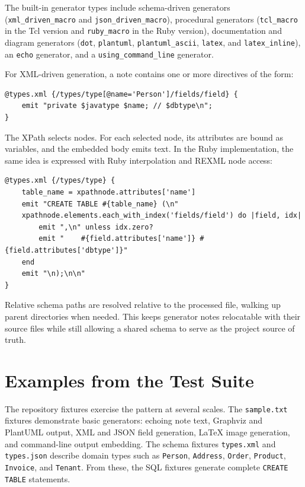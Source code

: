 \documentclass[11pt]{article}
\begin{document}
The built-in generator types include schema-driven generators
(\texttt{xml\_driven\_macro} and \texttt{json\_driven\_macro}), procedural
generators (\texttt{tcl\_macro} in the Tcl version and \texttt{ruby\_macro} in
the Ruby version), documentation and diagram generators
(\texttt{dot}, \texttt{plantuml}, \texttt{plantuml\_ascii},
\texttt{latex}, and \texttt{latex\_inline}), an \texttt{echo} generator, and a
\texttt{using\_command\_line} generator.

For XML-driven generation, a note contains one or more directives of the form:

\begin{lstlisting}[style=embgen]
@types.xml {/types/type[@name='Person']/fields/field} {
    emit "private $javatype $name; // $dbtype\n";
}
\end{lstlisting}

The XPath selects nodes.  For each selected node, its attributes are bound as
variables, and the embedded body emits text.  In the Ruby implementation, the
same idea is expressed with Ruby interpolation and REXML node access:

\begin{lstlisting}[style=embgen]
@types.xml {/types/type} {
    table_name = xpathnode.attributes['name']
    emit "CREATE TABLE #{table_name} (\n"
    xpathnode.elements.each_with_index('fields/field') do |field, idx|
        emit ",\n" unless idx.zero?
        emit "    #{field.attributes['name']} #{field.attributes['dbtype']}"
    end
    emit "\n);\n\n"
}
\end{lstlisting}

Relative schema paths are resolved relative to the processed file, walking up
parent directories when needed.  This keeps generator notes relocatable with
their source files while still allowing a shared schema to serve as the project
source of truth.

\section{Examples from the Test Suite}

The repository fixtures exercise the pattern at several scales.  The
\texttt{sample.txt} fixtures demonstrate basic generators: echoing note text,
Graphviz and PlantUML output, XML and JSON field generation, LaTeX image
generation, and command-line output embedding.  The schema fixtures
\texttt{types.xml} and \texttt{types.json} describe domain types such as
\texttt{Person}, \texttt{Address}, \texttt{Order}, \texttt{Product},
\texttt{Invoice}, and \texttt{Tenant}.  From these, the SQL fixtures generate
complete \texttt{CREATE TABLE} statements.
\end{document}
